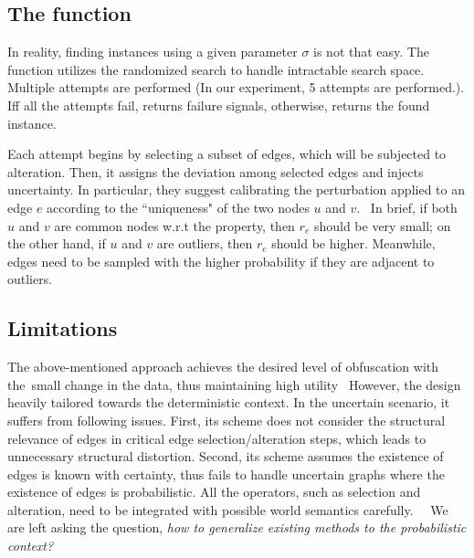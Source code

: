 \subsection{The function {\genobf}}
In reality, finding {\keobf} instances using a given parameter $\sigma$ is not that easy.
The function {\genobf} utilizes the randomized search to handle intractable search space. Multiple attempts are performed (In our experiment, 5 attempts are performed.). Iff all the attempts fail, {\genobf} returns failure signals, otherwise, returns the found {\keobf} instance. 

Each attempt begins by selecting a subset of edges, which will be subjected to alteration. Then, it assigns the deviation among selected edges and injects uncertainty. 
In particular, they suggest calibrating the perturbation applied to an edge $e$ according to the ``uniqueness" of the two nodes $u$ and $v$. 
In brief, if both $u$ and $v$ are common nodes w.r.t the property, then $r_{e}$ should be very small; on the other hand, if $u$ and $v$ are outliers, then $r_{e}$ should be higher. Meanwhile, edges need to be sampled with the higher probability if they are adjacent to outliers. 


\subsection{Limitations} 
The above-mentioned approach achieves the desired level of obfuscation with the small change in the data, thus maintaining high utility 
However, the design heavily tailored towards the deterministic context. In the uncertain scenario, it suffers from following issues. 
First, its scheme does not consider the structural relevance of edges in critical edge selection/alteration steps, which leads to unnecessary structural distortion. 
Second, its scheme assumes the existence of edges is known with certainty, thus fails to handle uncertain graphs where the existence of edges is probabilistic. 
All the operators, such as selection and alteration, need to be integrated with possible world semantics carefully.  
We are left asking the question, \emph{how to generalize existing methods to the probabilistic context?}



